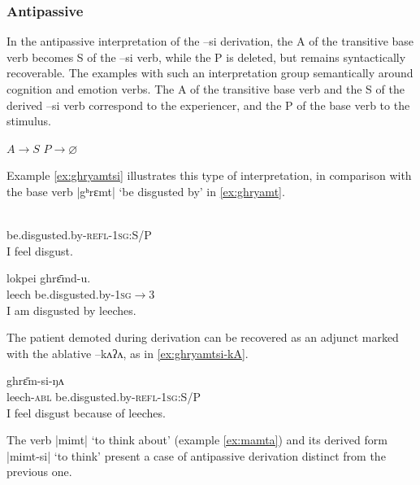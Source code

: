 \documentclass[twoside,a4paper,11pt]{article}
\newcommand{\ipa}[1]{{\phon#1}}
\begin{document}
\subsubsection{Antipassive}
In the antipassive  interpretation of the \ipa{--si} derivation, the A of the transitive base verb becomes S of the  \ipa{--si} verb, while the P is deleted, but remains syntactically recoverable. The  examples with such an interpretation  group semantically around cognition and emotion verbs. The A of the transitive base verb and the S of the derived \ipa{--si} verb correspond to the experiencer, and the P of the base verb to the stimulus.

 \begin{exe}
\ex \label{ex:antipass}
\glt $A  \rightarrow S$  
\glt $P \rightarrow \varnothing  $  
\end{exe}

Example \ref{ex:ghryamtsi} illustrates this type of interpretation, in comparison with the base verb |\ipa{gʰrɛmt}| `be disgusted by' in \ref{ex:ghryamt}.

 \begin{exe}
\ex \label{ex:ghryamtsi} 
\gll \ipa{gʰrɛ̄m-si-ŋʌ}\\
 be.disgusted.by-\textsc{refl-1sg:S/P} \\
\glt  I feel disgust.
\end{exe}

\begin{exe}
\ex \label{ex:ghryamt} 
\gll 
  	\ipa{lokpei}  	\ipa{ghrɛ̄md-u.}  \\
leech  be.disgusted.by-\textsc{1sg$\rightarrow$3} \\
 \glt  I am disgusted by leeches.
\end{exe}

The patient demoted during derivation can be recovered as an adjunct marked with the ablative \ipa{--kʌʔʌ}, as in \ref{ex:ghryamtsi-kA}.

 \begin{exe}
\ex \label{ex:ghryamtsi-kA} 
\gll 	\ipa{lokpei-kʌʔʌ} \ipa{ghrɛ̄m-si-ŋʌ}\\
leech-\textsc{abl} be.disgusted.by-\textsc{refl-1sg:S/P} \\
 \glt  I feel disgust because of leeches.
\end{exe}
 

The verb |\ipa{mimt}| `to think about' (example \ref{ex:mamta}) and its derived form |\ipa{mimt-si}| `to think' present a case of antipassive derivation distinct from the previous one. 
\end{document}
